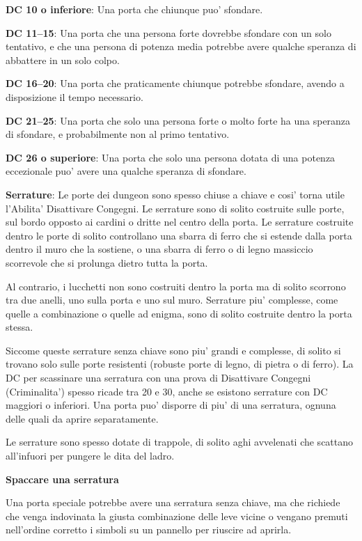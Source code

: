\documentclass[a4paper,11pt,twoside,openany]{book}
\begin{document}
{\textbf{DC 10 o inferiore}: Una porta che chiunque puo' sfondare.

\textbf{DC 11--15}: Una porta che una persona forte dovrebbe sfondare con un solo tentativo, e che una persona di potenza media potrebbe avere qualche speranza di abbattere in un solo colpo.

\textbf{DC 16--20}: Una porta che praticamente chiunque potrebbe sfondare, avendo a disposizione il tempo necessario. 

\textbf{DC 21--25}: Una porta che solo una persona forte o molto forte ha una speranza di sfondare, e probabilmente non al primo tentativo. 

\textbf{DC 26 o superiore}: Una porta che solo una persona dotata di una potenza eccezionale puo' avere una qualche speranza di sfondare.

\textbf{Serrature}: Le porte dei dungeon sono spesso chiuse a chiave e cosi' torna utile l'Abilita' Disattivare Congegni. Le serrature sono di solito costruite sulle porte, sul bordo opposto ai cardini o dritte nel centro della porta. Le serrature costruite dentro le porte di solito controllano una sbarra di ferro che si estende dalla porta dentro il muro che la sostiene, o una sbarra di ferro o di legno massiccio scorrevole che si prolunga dietro tutta la porta. 

Al contrario, i lucchetti non sono costruiti dentro la porta ma di solito scorrono tra due anelli, uno sulla porta e uno sul muro. Serrature piu' complesse, come quelle a combinazione o quelle ad enigma, sono di solito costruite dentro la porta stessa. 

Siccome queste serrature senza chiave sono piu' grandi e complesse, di solito si trovano solo sulle porte resistenti (robuste porte di legno, di pietra o di ferro). 
La DC per scassinare una serratura con una prova di Disattivare Congegni (Criminalita') spesso ricade tra 20 e 30, anche se esistono serrature con DC maggiori o inferiori. Una porta puo' disporre di piu' di una serratura, ognuna delle quali da aprire separatamente.

Le serrature sono spesso dotate di trappole, di solito aghi avvelenati che scattano all'infuori per pungere le dita del ladro.

\textbf{Spaccare una serratura}

Una porta speciale potrebbe avere una serratura senza chiave, ma che richiede che venga indovinata la giusta combinazione delle leve vicine o vengano premuti nell'ordine corretto i simboli su un pannello per riuscire ad aprirla.

}
\end{document}

